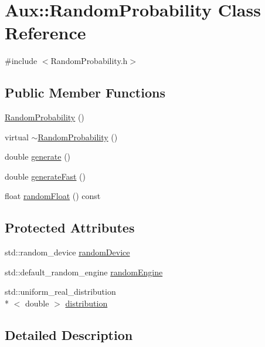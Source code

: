 \hypertarget{class_aux_1_1_random_probability}{\section{Aux\-:\-:Random\-Probability Class Reference}
\label{class_aux_1_1_random_probability}
}


{\ttfamily \#include $<$Random\-Probability.\-h$>$}

\subsection*{Public Member Functions}
\begin{DoxyCompactItemize}
\item 
\hyperlink{class_aux_1_1_random_probability_a6245bc307c811624b4d2c19b7a501ba6}{Random\-Probability} ()
\item 
virtual \hyperlink{class_aux_1_1_random_probability_a26406304e21f5208fd9528f883edbf93}{$\sim$\-Random\-Probability} ()
\item 
double \hyperlink{class_aux_1_1_random_probability_aa3f2835c364aabb340440c45f6a28e33}{generate} ()
\item 
double \hyperlink{class_aux_1_1_random_probability_a485840c50b8530b72556e1a786286896}{generate\-Fast} ()
\item 
float \hyperlink{class_aux_1_1_random_probability_acc6acade47041865801512efb45199b8}{random\-Float} () const 
\end{DoxyCompactItemize}
\subsection*{Protected Attributes}
\begin{DoxyCompactItemize}
\item 
std\-::random\-\_\-device \hyperlink{class_aux_1_1_random_probability_ae714dbdb46cb0ab965d2e2f544f9ad4a}{random\-Device}
\item 
std\-::default\-\_\-random\-\_\-engine \hyperlink{class_aux_1_1_random_probability_af8f4edb5271507e52daad5b0ceff1680}{random\-Engine}
\item 
std\-::uniform\-\_\-real\-\_\-distribution\\*
$<$ double $>$ \hyperlink{class_aux_1_1_random_probability_aea37d3428c64a4d88cfec092f1fa5d85}{distribution}
\end{DoxyCompactItemize}


\subsection{Detailed Description}


